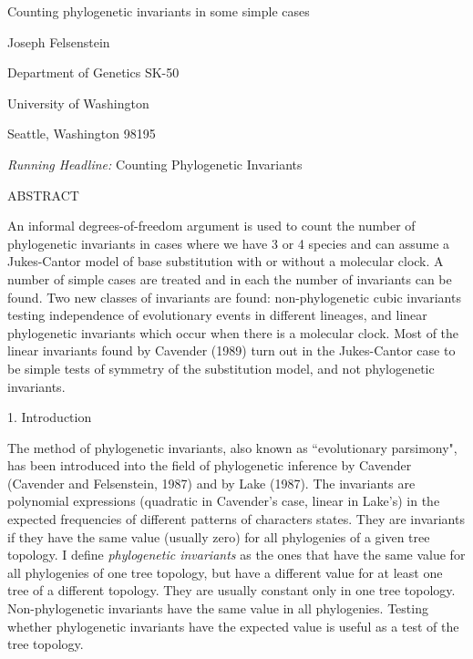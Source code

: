 \def\baselinestretch{1.5}

\centerline{Counting phylogenetic invariants in some simple cases} 

\bigskip
\centerline{Joseph Felsenstein}
\bigskip 

\medskip
\centerline{Department of Genetics SK-50}
\medskip 

\centerline{University of Washington}
\medskip
\centerline{Seattle, Washington 98195}
\bigskip 

\bigskip 

\centerline{{\it Running Headline:}  Counting Phylogenetic Invariants}
\bigskip 

\bigskip 

\centerline{ABSTRACT}
\medskip

An informal degrees-of-freedom argument is used to count the number of 
phylogenetic invariants in cases where we have 3 or 4 species and can assume a 
Jukes-Cantor model of base substitution with or without a molecular clock.
A number of simple cases are treated 
and in each the number of invariants can be found.  Two new classes of 
invariants are found: non-phylogenetic cubic invariants testing independence 
of evolutionary events in different lineages, and linear phylogenetic 
invariants which occur when there is a molecular clock.  Most of the linear 
invariants found by Cavender (1989) turn out in the Jukes-Cantor case to be 
simple tests of symmetry of the substitution model, and not phylogenetic 
invariants.
\bigskip 

\centerline{1. Introduction}
\medskip 

The method of phylogenetic invariants, also known as ``evolutionary parsimony", 
has been introduced into the field of phylogenetic inference by Cavender 
(Cavender and Felsenstein, 1987) and by Lake (1987).  The invariants are 
polynomial expressions (quadratic in Cavender's case, linear in Lake's) in the 
expected frequencies of different patterns of characters states.  They are 
invariants if they have the same value (usually zero) for all phylogenies of a 
given tree topology.  I define {\it phylogenetic invariants} as the ones that 
have the same value for all phylogenies of one tree topology, but have a
different value for at least one tree of a different topology.  They are
usually 
constant only in one tree topology.  Non-phylogenetic invariants have the
same value in all phylogenies.  Testing whether phylogenetic invariants have
the expected value is useful as a test of the tree topology. 

